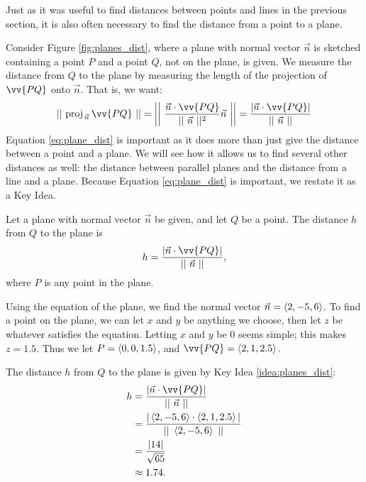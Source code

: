 Just as it was useful to find distances between points and lines in the previous section, it is also often necessary to find the distance from a point to a plane. 

Consider Figure \ref{fig:planes_dist}, where a plane with normal vector $\vec n$ is sketched containing a point $P$ and a point $Q$, not on the plane, is given. We measure the distance from $Q$ to the plane by measuring the length of the projection of $\vv{PQ}$ onto $\vec n$. That is, we want:
\begin{equation}\snorm{\text{proj}_{\,\vec n}\,{\vv{PQ}}} = \snorm{\frac{\vec n\cdot \vv{PQ}}{\vnorm n^2}\vec n} = \frac{|\vec n\cdot \vv{PQ}|}{\vnorm n}\label{eq:plane_dist}
\end{equation}
Equation \eqref{eq:plane_dist} is important as it does more than just give the distance between a point and a plane. We will see how it allows us to find several other distances as well: the distance between parallel planes and the distance from a line and a plane. Because Equation \eqref{eq:plane_dist} is important, we restate it as a Key Idea.

{Let a plane with normal vector $\vec n$ be given, and let $Q$ be a point. The distance $h$ from $Q$ to the plane is 
$$h = \frac{|\vec n\cdot \vv{PQ}|}{\vnorm n},$$
where $P$ is any point in the plane.
}

{Using the equation of the plane, we find the normal vector $\vec n = \left\langle 2,-5,6\right\rangle$. To find a point on the plane, we can let $x$ and $y$ be anything we choose, then let $z$ be whatever satisfies the equation. Letting $x$ and $y$ be 0 seems simple; this makes $z = 1.5$. Thus we let $P = \left\langle 0,0,1.5\right\rangle$, and $\vv{PQ} = \la 2,1,2.5\ra.$

The distance $h$ from $Q$ to the plane is given by Key Idea \ref{idea:planes_dist}:
\begin{align*}
h &= \frac{|\vec n\cdot \vv{PQ}|}{\vnorm n} \\
  &= \frac{|\la 2,-5,6\ra \cdot \la 2,1,2.5\ra|}{\norm{\la 2,-5,6\ra}} \\
	&= \frac{ |14|}{\sqrt{65}} \\
	&\approx 1.74.
\end{align*}
\baselineskip
}\\

